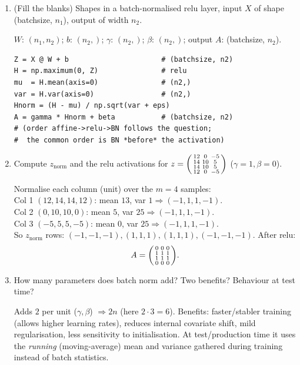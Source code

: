 \documentclass[10pt,a4paper]{article}
\newcommand{\q}[1]{\item #1}
\begin{document}
\begin{enumerate}[leftmargin=*,label=\textbf{Q\arabic*.}]

\q (Fill the blanks) Shapes in a batch-normalised relu layer, input $X$ of shape (batchsize, $n_1$), output of width $n_2$.
\begin{answerbox}
$W$: $(n_1, n_2)$; $b$: $(n_2,)$; $\gamma$: $(n_2,)$; $\beta$: $(n_2,)$; output $A$: (batchsize, $n_2$).
\end{answerbox}
\begin{verbatim}
Z = X @ W + b                      # (batchsize, n2)
H = np.maximum(0, Z)               # relu
mu  = H.mean(axis=0)               # (n2,)
var = H.var(axis=0)                # (n2,)
Hnorm = (H - mu) / np.sqrt(var + eps)
A = gamma * Hnorm + beta           # (batchsize, n2)
# (order affine->relu->BN follows the question;
#  the common order is BN *before* the activation)
\end{verbatim}

\q Compute $z_{\text{norm}}$ and the relu activations for $z=\begin{psmallmatrix}12&0&-5\\14&10&5\\14&10&5\\12&0&-5\end{psmallmatrix}$ ($\gamma=1,\beta=0$).
\begin{answerbox}
Normalise each column (unit) over the $m=4$ samples:\\
Col 1 $(12,14,14,12)$: mean $13$, var $1 \Rightarrow (-1,1,1,-1)$.\\
Col 2 $(0,10,10,0)$: mean $5$, var $25 \Rightarrow (-1,1,1,-1)$.\\
Col 3 $(-5,5,5,-5)$: mean $0$, var $25 \Rightarrow (-1,1,1,-1)$.\\
So $z_{\text{norm}}$ rows: $(-1,-1,-1),(1,1,1),(1,1,1),(-1,-1,-1)$. After relu:
\[ A=\begin{psmallmatrix}0&0&0\\1&1&1\\1&1&1\\0&0&0\end{psmallmatrix}. \]
\end{answerbox}

\q How many parameters does batch norm add? Two benefits? Behaviour at test time?
\begin{answerbox}
Adds $2$ per unit ($\gamma,\beta$) $\Rightarrow 2n$ (here $2\cdot3=6$). Benefits: faster/stabler training (allows higher learning rates), reduces internal covariate shift, mild regularisation, less sensitivity to initialisation. At test/production time it uses the \emph{running} (moving-average) mean and variance gathered during training instead of batch statistics.
\end{answerbox}

\end{enumerate}
\end{document}
